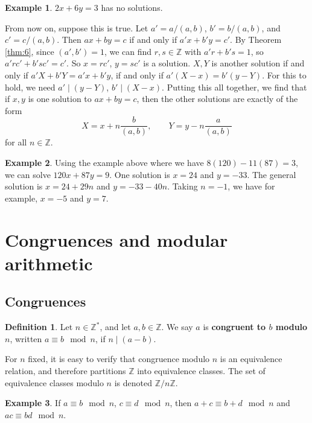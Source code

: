 \documentclass{article}
\newcommand{\Z}{\mathbb{Z}}
\newcommand{\rb}[1]{\left( #1 \right)}
\theoremstyle{definition}\newtheorem{definition}{Definition}
\theoremstyle{definition}\newtheorem*{remark}{Remark}
\theoremstyle{definition}\newtheorem*{example}{Example}
\theoremstyle{definition}\newtheorem*{note}{Note}
\begin{document}
\begin{example}
$ 2x + 6y = 3 $ has no solutions.
\end{example}

From now on, suppose this is true. Let $ a' = a / \rb{a, b} $, $ b' = b / \rb{a, b} $, and $ c' = c / \rb{a, b} $. Then $ ax + by = c $ if and only if $ a'x + b'y = c' $. By Theorem \ref{thm:6}, since $ \rb{a', b'} = 1 $, we can find $ r, s \in \Z $ with $ a'r + b's = 1 $, so $ a'rc' + b'sc' = c' $. So $ x = rc' $, $ y = sc' $ is a solution. $ X, Y $ is another solution if and only if $ a'X + b'Y = a'x + b'y $, if and only if $ a'\rb{X - x} = b'\rb{y - Y} $. For this to hold, we need $ a' \mid \rb{y - Y} $, $ b' \mid \rb{X - x} $. Putting this all together, we find that if $ x, y $ is one solution to $ ax + by = c $, then the other solutions are exactly of the form
$$ X = x + n\dfrac{b}{\rb{a, b}}, \qquad Y = y - n\dfrac{a}{\rb{a, b}} $$
for all $ n \in \Z $.

\begin{example}
Using the example above where we have $ 8\rb{120} - 11\rb{87} = 3 $, we can solve $ 120x + 87y = 9 $. One solution is $ x = 24 $ and $ y = -33 $. The general solution is $ x = 24 + 29n $ and $ y = -33 - 40n $. Taking $ n = -1 $, we have for example, $ x = -5 $ and $ y = 7 $.
\end{example}

\section{Congruences and modular arithmetic}

\subsection{Congruences}

\begin{definition}
Let $ n \in \Z^* $, and let $ a, b \in \Z $. We say $ a $ is \textbf{congruent to $ b $ modulo $ n $}, written $ a \equiv b \mod n $, if $ n \mid \rb{a - b} $.
\end{definition}

For $ n $ fixed, it is easy to verify that congruence modulo $ n $ is an equivalence relation, and therefore partitions $ \Z $ into equivalence classes. The set of equivalence classes modulo $ n $ is denoted $ \Z / n\Z $.

\begin{example}
If $ a \equiv b \mod n $, $ c \equiv d \mod n $, then $ a + c \equiv b + d \mod n $ and $ ac \equiv bd \mod n $.
\end{example}
\end{document}
